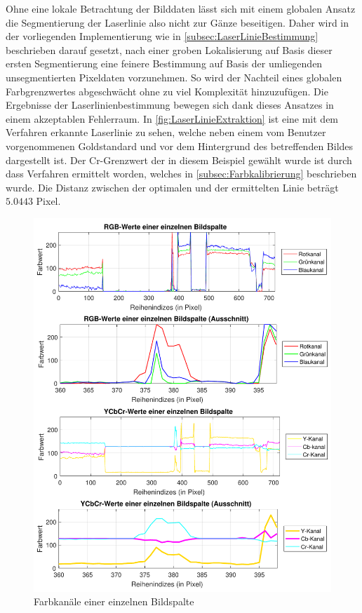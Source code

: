\bigbreak
Ohne eine lokale Betrachtung der Bilddaten lässt sich mit einem globalen Ansatz die Segmentierung der Laserlinie also nicht zur  Gänze beseitigen. Daher wird in der vorliegenden Implementierung wie in \ref{subsec:LaserLinieBestimmung} beschrieben darauf gesetzt, nach einer groben Lokalisierung auf Basis dieser ersten Segmentierung eine feinere Bestimmung auf Basis der umliegenden unsegmentierten Pixeldaten vorzunehmen. So wird der Nachteil eines globalen Farbgrenzwertes abgeschwächt ohne zu viel Komplexität hinzuzufügen. Die Ergebnisse der Laserlinienbestimmung bewegen sich dank dieses Ansatzes in einem akzeptablen Fehlerraum. In \ref{fig:LaserLinieExtraktion} ist eine mit dem Verfahren erkannte Laserlinie zu sehen, welche neben einem vom Benutzer vorgenommenen Goldstandard und vor dem Hintergrund des betreffenden Bildes dargestellt ist. Der Cr-Grenzwert der in diesem Beispiel gewählt wurde ist durch dass Verfahren ermittelt worden, welches in \ref{subsec:Farbkalibrierung} beschrieben wurde. Die Distanz zwischen der optimalen und der ermittelten Linie beträgt \(5.0443\) Pixel.

\begin{figure}
\centering \includegraphics[width=\textwidth]{images/Colour.pdf}
\caption[Farbkanäle einer einzelnen Bildspalte]{Farbkanäle einer einzelnen Bildspalte}\label{fig:farbwerte}
\end{figure}

